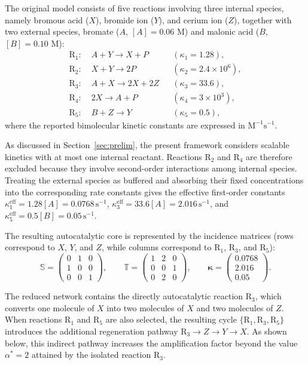 \documentclass[a4paper,11pt,reqno]{amsart}
\begin{document}
The original model consists of five reactions involving three internal species,
namely bromous acid ($X$), bromide ion ($Y$), and cerium ion ($Z$), together
with two external species, bromate ($A$, $[A]=0.06$ M) and malonic acid
($B$, $[B]=0.10$ M):
\begin{align*}
  \mathrm R_1:\;&A+Y\rightarrow X+P
  &&(\kappa_1=1.28),\\
  \mathrm R_2:\;&X+Y\rightarrow2P
  &&(\kappa_2=2.4\times10^6),\\
  \mathrm R_3:\;&A+X\rightarrow2X+2Z
  &&(\kappa_3=33.6),\\
  \mathrm R_4:\;&2X\rightarrow A+P
  &&(\kappa_4=3\times10^3),\\
  \mathrm R_5:\;&B+Z\rightarrow Y
  &&(\kappa_5=0.5),
\end{align*}
where the reported bimolecular kinetic constants are expressed in
$\mathrm{M}^{-1}\mathrm{s}^{-1}$.

As discussed in Section~\ref{sec:prelim}, the present framework considers
scalable kinetics with at most one internal reactant. Reactions $\mathrm R_2$
and $\mathrm R_4$ are therefore excluded because they involve second-order
interactions among internal species. Treating the external species as
buffered and absorbing their fixed concentrations into the corresponding
rate constants gives the effective first-order constants
$\kappa_1^{\mathrm{eff}}=1.28[A]=0.0768\,\mathrm{s}^{-1}$,
$\kappa_3^{\mathrm{eff}}=33.6[A]=2.016\,\mathrm{s}^{-1}$, and
$\kappa_5^{\mathrm{eff}}=0.5[B]=0.05\,\mathrm{s}^{-1}$.

The resulting autocatalytic core is represented by the incidence matrices
(rows correspond to $X$, $Y$, and $Z$, while columns correspond to
$\mathrm R_1$, $\mathrm R_3$, and $\mathrm R_5$):
$$
\mathbb S=
\begin{pmatrix}
0&1&0\\
1&0&0\\
0&0&1
\end{pmatrix},
\qquad
\mathbb T=
\begin{pmatrix}
1&2&0\\
0&0&1\\
0&2&0
\end{pmatrix},
\qquad
\boldsymbol{\kappa}=
\begin{pmatrix}
0.0768\\
2.016\\
0.05
\end{pmatrix}.
$$

The reduced network contains the directly autocatalytic reaction
$\mathrm R_3$, which converts one molecule of $X$ into two molecules of $X$
and two molecules of $Z$. When reactions $\mathrm R_1$ and $\mathrm R_5$ are
also selected, the resulting cycle
$\{\mathrm R_1,\mathrm R_3,\mathrm R_5\}$ introduces the additional
regeneration pathway
$\mathrm R_3\rightarrow Z\rightarrow Y\rightarrow X$.
As shown below, this indirect pathway increases the amplification factor beyond
the value $\alpha^*=2$ attained by the isolated reaction $\mathrm R_3$.
\end{document}
